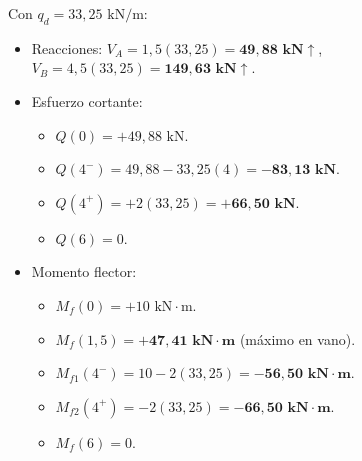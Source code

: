 Con $q_d = 33{,}25\text{ kN/m}$:
\begin{itemize}
    \item Reacciones: $V_A = 1{,}5(33{,}25) = \mathbf{49{,}88\text{ kN}\uparrow}$, $V_B = 4{,}5(33{,}25) = \mathbf{149{,}63\text{ kN}\uparrow}$.
    \item Esfuerzo cortante:
          \begin{itemize}
              \item $Q(0) = +49{,}88\text{ kN}$.
              \item $Q(4^-) = 49{,}88 - 33{,}25(4) = \mathbf{-83{,}13\text{ kN}}$.
              \item $Q(4^+) = +2(33{,}25) = \mathbf{+66{,}50\text{ kN}}$.
              \item $Q(6) = 0$.
          \end{itemize}
    \item Momento flector:
          \begin{itemize}
              \item $M_f(0) = +10\text{ kN}\cdot\text{m}$.
              \item $M_f(1{,}5) = \mathbf{+47{,}41\text{ kN}\cdot\text{m}}$ (máximo en vano).
              \item $M_{f1}(4^-) = 10 - 2(33{,}25) = \mathbf{-56{,}50\text{ kN}\cdot\text{m}}$.
              \item $M_{f2}(4^+) = -2(33{,}25) = \mathbf{-66{,}50\text{ kN}\cdot\text{m}}$.
              \item $M_f(6) = 0$.
          \end{itemize}
\end{itemize}


